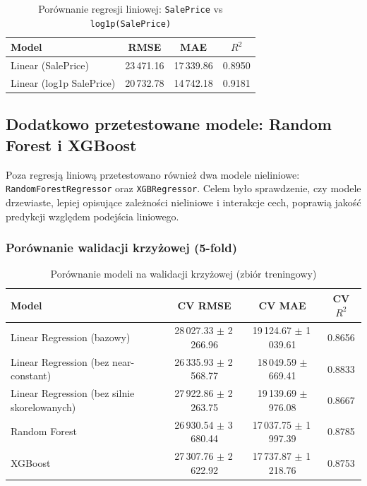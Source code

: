 \documentclass[12pt, a4paper]{article}
\begin{document}
\begin{table}[H]
\centering
\caption{Porównanie regresji liniowej: \texttt{SalePrice} vs \texttt{log1p(SalePrice)}}
\label{tab:log_target_compare}
\begin{tabular}{|l|c|c|c|}
\hline
\textbf{Model} & \textbf{RMSE} & \textbf{MAE} & \textbf{$R^2$} \\
\hline
Linear (SalePrice) & 23\,471.16 & 17\,339.86 & 0.8950 \\
Linear (log1p SalePrice) & 20\,732.78 & 14\,742.18 & 0.9181 \\
\hline
\end{tabular}
\end{table}


\subsection{Dodatkowo przetestowane modele: Random Forest i XGBoost}

Poza regresją liniową przetestowano również dwa modele nieliniowe: \texttt{RandomForestRegressor} oraz \texttt{XGBRegressor}. Celem było sprawdzenie, czy modele drzewiaste, lepiej opisujące zależności nieliniowe i interakcje cech, poprawią jakość predykcji względem podejścia liniowego.

\subsubsection*{Porównanie walidacji krzyżowej (5-fold)}

\begin{table}[H]
\centering
\caption{Porównanie modeli na walidacji krzyżowej (zbiór treningowy)}
\label{tab:regression_cv_compare}
\begin{tabular}{|l|c|c|c|}
\hline
\textbf{Model} & \textbf{CV RMSE} & \textbf{CV MAE} & \textbf{CV $R^2$} \\
\hline
Linear Regression (bazowy) & 28\,027.33 $\pm$ 2\,266.96 & 19\,124.67 $\pm$ 1\,039.61 & 0.8656 \\
Linear Regression (bez near-constant) & 26\,335.93 $\pm$ 2\,568.77 & 18\,049.59 $\pm$ 669.41 & 0.8833 \\
Linear Regression (bez silnie skorelowanych) & 27\,922.86 $\pm$ 2\,263.75 & 19\,139.69 $\pm$ 976.08 & 0.8667  \\
Random Forest & 26\,930.54 $\pm$ 3\,680.44 & 17\,037.75 $\pm$ 1\,997.39 & 0.8785  \\
XGBoost & 27\,307.76 $\pm$ 2\,622.92 & 17\,737.87 $\pm$ 1\,218.76 & 0.8753 \\
\hline
\end{tabular}
\end{table}
\end{document}
